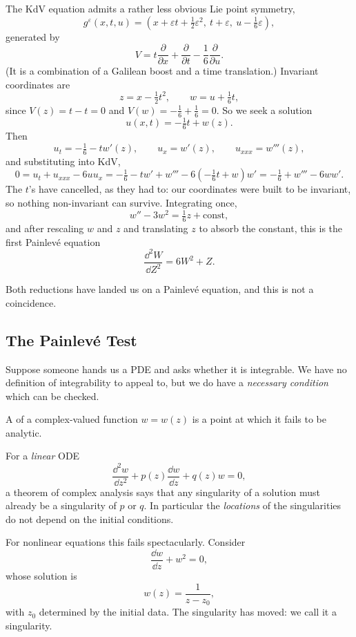 \documentclass[a4paper]{scrartcl}
\begin{document}
\begin{example}[KdV]
	The KdV equation admits a rather less obvious Lie point symmetry,
	$$
	g^\varepsilon(x,t,u) = \left(x + \varepsilon t + \tfrac12\varepsilon^2,\ t+\varepsilon,\ u - \tfrac16\varepsilon\right),
	$$
	generated by
	$$
	V = t\frac{\partial}{\partial x} + \frac{\partial}{\partial t} - \frac16\frac{\partial}{\partial u}.
	$$
	(It is a combination of a Galilean boost and a time translation.) Invariant coordinates are
	$$
	z = x - \tfrac12t^2, \qquad w = u + \tfrac16 t,
	$$
	since $V(z) = t - t = 0$ and $V(w) = -\frac16+\frac16 = 0$. So we seek a solution
	$$
	u(x,t) = -\tfrac16t + w(z).
	$$
	Then
	$$
	u_t = -\tfrac16 - tw'(z), \qquad u_x = w'(z), \qquad u_{xxx} = w'''(z),
	$$
	and substituting into KdV,
	$$
	0 = u_t + u_{xxx} - 6uu_x = -\tfrac16 - tw' + w''' - 6\left(-\tfrac16t + w\right)w' = -\tfrac16 + w''' - 6ww'.
	$$
	The $t$'s have cancelled, as they had to: our coordinates were built to be invariant, so nothing non-invariant can survive. Integrating once,
	$$
	w'' - 3w^2 = \tfrac16z + \text{const},
	$$
	and after rescaling $w$ and $z$ and translating $z$ to absorb the constant, this is the first Painlev\'e equation
	$$
	\frac{\dd^2W}{\dd Z^2} = 6W^2 + Z.
	$$
\end{example}

Both reductions have landed us on a Painlev\'e equation, and this is not a coincidence.

\subsection{The Painlev\'e Test}

Suppose someone hands us a PDE and asks whether it is integrable. We have no definition of integrability to appeal to, but we do have a \emph{necessary condition} which can be checked.

\begin{definition}[Singularity]
	A  of a complex-valued function $w = w(z)$ is a point at which it fails to be analytic.
\end{definition}

For a \emph{linear} ODE
$$
\frac{\dd^2w}{\dd z^2} + p(z)\frac{\dd w}{\dd z} + q(z)w = 0,
$$
a theorem of complex analysis says that any singularity of a solution must already be a singularity of $p$ or $q$. In particular the \emph{locations} of the singularities do not depend on the initial conditions.

For nonlinear equations this fails spectacularly. Consider
$$
\frac{\dd w}{\dd z} + w^2 = 0,
$$
whose solution is
$$
w(z) = \frac{1}{z - z_0},
$$
with $z_0$ determined by the initial data. The singularity has moved: we call it a  singularity.
\end{document}
